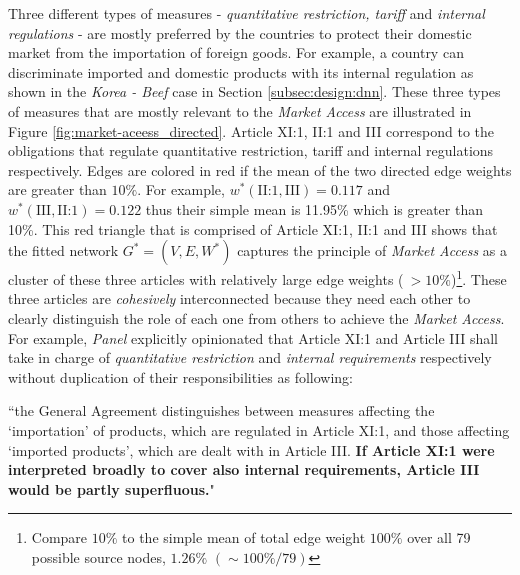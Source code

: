  Three different types of measures - \textit{quantitative restriction, tariff} and \textit{internal regulations} - are mostly preferred by the countries to protect their domestic market from the importation of foreign goods. For example, a country can
 discriminate imported and domestic products with its internal regulation as shown in the \textit{Korea - Beef} case in Section \ref{subsec:design:dnn}.
 These three types of measures that are mostly relevant to the \textit{Market Access} are illustrated in Figure \ref{fig:market-aceess_directed}.
 Article XI:1, II:1 and III correspond to the obligations that regulate quantitative restriction, tariff and internal regulations respectively.
 Edges are colored in red if the mean of the two directed edge weights are greater than $10\%$. For example, $w^*(\text{II:1}, \text{III}) = 0.117$ and $w^*(\text{III}, \text{II:1}) = 0.122$ thus their simple mean is 11.95\% which is greater than 10\%.
 This red triangle that is comprised of Article XI:1, II:1 and III shows that the fitted network $G^* = (V, E, W^*)$ captures the principle of \textit{Market Access} as a cluster of these three articles with relatively large edge weights ($\: >10\%$)\footnote{Compare $10\%$ to the simple mean of total edge weight $100\%$ over all 79 possible source nodes, $1.26\%$ $(\sim 100\% / 79)$}.
 These three articles are \textit{cohesively} interconnected because they need each other to clearly distinguish the role of each one from others to achieve the \textit{Market Access}.
 For example, \textit{Panel} explicitly opinionated that Article XI:1 and Article III shall take in charge of \textit{quantitative restriction} and \textit{internal requirements} respectively without duplication of their responsibilities as following:
  
 \begin{displayquote}[][]
 ``the General Agreement distinguishes between measures affecting the `importation' of products,
 which are regulated in Article XI:1, and those affecting `imported products', which are dealt with in
 Article III. \textbf{If Article XI:1 were interpreted broadly to cover also internal requirements, Article III
 would be partly superfluous.}"
 \end{displayquote}
  
